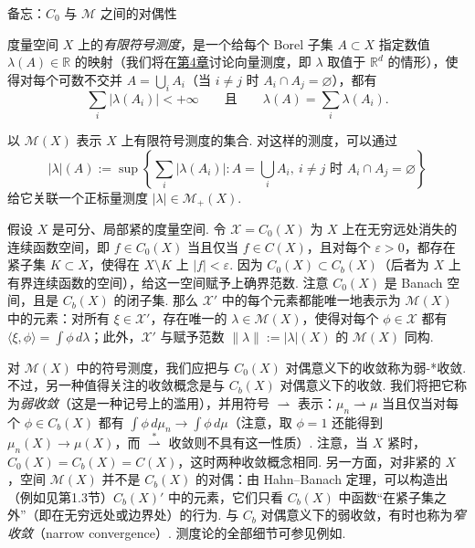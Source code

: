 \begin{sourcebox}{备忘：$C_0$ 与 $\mathscr M$ 之间的对偶性}\label{box:1.3}
\begin{definition*}
度量空间 $X$ 上的\emph{有限符号测度}，是一个给每个 Borel 子集 $A\subset X$ 指定数值 $\lambda(A)\in\mathbb R$ 的映射（我们将在\hyperref[sec:4]{第4章}讨论向量测度，即 $\lambda$ 取值于 $\mathbb R^d$ 的情形），使得对每个可数不交并 $A=\bigcup_i A_i$（当 $i\ne j$ 时 $A_i\cap A_j=\varnothing$），都有
\[
\sum_i|\lambda(A_i)|<+\infty\qquad\text{且}\qquad\lambda(A)=\sum_i\lambda(A_i).
\]
\end{definition*}

以 $\mathscr M(X)$ 表示 $X$ 上有限符号测度的集合. 对这样的测度，可以通过
\[
|\lambda|(A):=\sup\left\{\sum_i|\lambda(A_i)|:A=\bigcup_i A_i,\ i\ne j\text{ 时 }A_i\cap A_j=\varnothing\right\}
\]
给它关联一个正标量测度 $|\lambda|\in\mathscr M_+(X)$.

\begin{theorem*}[Riesz表示定理]
假设 $X$ 是可分、局部紧的度量空间. 令 $\mathscr X=C_0(X)$ 为 $X$ 上在无穷远处消失的连续函数空间，即 $f\in C_0(X)$ 当且仅当 $f\in C(X)$，且对每个 $\varepsilon>0$，都存在紧子集 $K\subset X$，使得在 $X\setminus K$ 上 $|f|<\varepsilon$. 因为 $C_0(X)\subset C_b(X)$（后者为 $X$ 上有界连续函数的空间），给这一空间赋予上确界范数. 注意 $C_0(X)$ 是 Banach 空间，且是 $C_b(X)$ 的闭子集. 那么 $\mathscr X'$ 中的每个元素都能唯一地表示为 $\mathscr M(X)$ 中的元素：对所有 $\xi\in\mathscr X'$，存在唯一的 $\lambda\in\mathscr M(X)$，使得对每个 $\phi\in\mathscr X$ 都有 $\langle\xi,\phi\rangle=\int\phi\,d\lambda$；此外，$\mathscr X'$ 与赋予范数 $\|\lambda\|:=|\lambda|(X)$ 的 $\mathscr M(X)$ 同构.
\end{theorem*}

对 $\mathscr M(X)$ 中的符号测度，我们应把与 $C_0(X)$ 对偶意义下的收敛称为弱-*收敛. 不过，另一种值得关注的收敛概念是与 $C_b(X)$ 对偶意义下的收敛. 我们将把它称为\emph{弱收敛}（这是一种记号上的滥用），并用符号 $\rightharpoonup$ 表示：$\mu_n\rightharpoonup\mu$ 当且仅当对每个 $\phi\in C_b(X)$ 都有 $\int\phi\,d\mu_n\to\int\phi\,d\mu$（注意，取 $\phi=1$ 还能得到 $\mu_n(X)\to\mu(X)$，而 $\overset{*}{\rightharpoonup}$ 收敛则不具有这一性质）. 注意，当 $X$ 紧时，$C_0(X)=C_b(X)=C(X)$，这时两种收敛概念相同. 另一方面，对非紧的 $X$，空间 $\mathscr M(X)$ 并不是 $C_b(X)$ 的对偶：由 Hahn--Banach 定理，可以构造出（例如见\cite{b292}第1.3节）$C_b(X)'$ 中的元素，它们只看 $C_b(X)$ 中函数“在紧子集之外”（即在无穷远处或边界处）的行为. 与 $C_b$ 对偶意义下的弱收敛，有时也称为\emph{窄收敛}（narrow convergence）. 测度论的全部细节可参见例如\cite{b268}.
\end{sourcebox}

